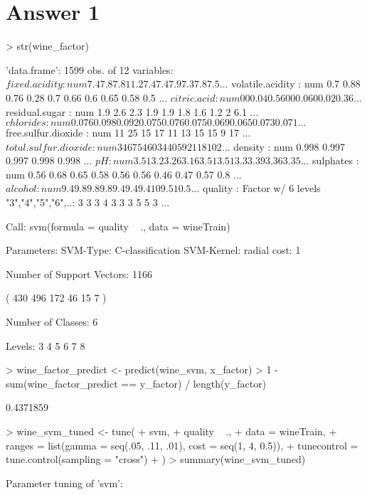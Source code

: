\documentclass{article}
\begin{document}
\section*{Answer  1}
\begin{Schunk}
\begin{Sinput}
> str(wine_factor)
\end{Sinput}
\begin{Soutput}
'data.frame':	1599 obs. of  12 variables:
 $ fixed.acidity       : num  7.4 7.8 7.8 11.2 7.4 7.4 7.9 7.3 7.8 7.5 ...
 $ volatile.acidity    : num  0.7 0.88 0.76 0.28 0.7 0.66 0.6 0.65 0.58 0.5 ...
 $ citric.acid         : num  0 0 0.04 0.56 0 0 0.06 0 0.02 0.36 ...
 $ residual.sugar      : num  1.9 2.6 2.3 1.9 1.9 1.8 1.6 1.2 2 6.1 ...
 $ chlorides           : num  0.076 0.098 0.092 0.075 0.076 0.075 0.069 0.065 0.073 0.071 ...
 $ free.sulfur.dioxide : num  11 25 15 17 11 13 15 15 9 17 ...
 $ total.sulfur.dioxide: num  34 67 54 60 34 40 59 21 18 102 ...
 $ density             : num  0.998 0.997 0.997 0.998 0.998 ...
 $ pH                  : num  3.51 3.2 3.26 3.16 3.51 3.51 3.3 3.39 3.36 3.35 ...
 $ sulphates           : num  0.56 0.68 0.65 0.58 0.56 0.56 0.46 0.47 0.57 0.8 ...
 $ alcohol             : num  9.4 9.8 9.8 9.8 9.4 9.4 9.4 10 9.5 10.5 ...
 $ quality             : Factor w/ 6 levels "3","4","5","6",..: 3 3 3 4 3 3 3 5 5 3 ...
\end{Soutput}
\begin{Soutput}
Call:
svm(formula = quality ~ ., data = wineTrain)


Parameters:
   SVM-Type:  C-classification 
 SVM-Kernel:  radial 
       cost:  1 

Number of Support Vectors:  1166

 ( 430 496 172 46 15 7 )


Number of Classes:  6 

Levels: 
 3 4 5 6 7 8
\end{Soutput}
\begin{Sinput}
> wine_factor_predict <- predict(wine_svm, x_factor)
> 1 - sum(wine_factor_predict == y_factor) / length(y_factor)
\end{Sinput}
\begin{Soutput}
[1] 0.4371859
\end{Soutput}
\begin{Sinput}
> wine_svm_tuned <- tune(
+   svm,
+   quality ~ .,
+   data = wineTrain,
+   ranges = list(gamma = seq(.05, .11, .01), cost = seq(1, 4, 0.5)),
+   tunecontrol = tune.control(sampling = "cross")
+ )
> summary(wine_svm_tuned)
\end{Sinput}
\begin{Soutput}
Parameter tuning of 'svm':


\end{Soutput}
\end{Schunk}
\end{document}
